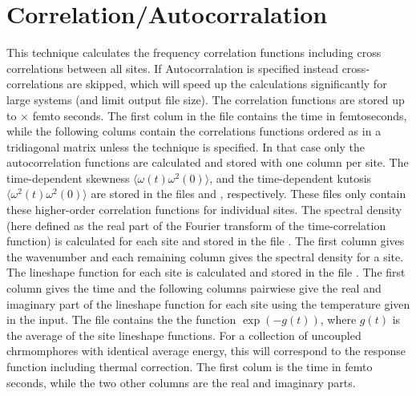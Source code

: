 \section{Correlation/Autocorralation}
This technique calculates the frequency correlation functions including cross
correlations between all sites. If Autocorralation is specified instead
cross-correlations are skipped, which will speed up the calculations significantly for
large systems (and limit output file size). The correlation functions are stored up
to $\times$ femto seconds. The first colum in the file
 contains the time in femtoseconds, while the following
colums contain the correlations functions ordered as in a tridiagonal matrix unless
the technique  is specified. In that case only the
autocorrelation functions are calculated and stored with one column per site.
The time-dependent skewness $\langle \omega(t)\omega^2(0) \rangle$, and the
time-dependent kutosis $\langle \omega^2(t)\omega^2(0) \rangle$ are stored in the files
 and , respectively. These files only contain these
higher-order correlation functions for individual sites. The spectral density (here
defined as the real part of the Fourier transform of the time-correlation function)
is calculated for each site and stored in the file . The first
column gives the wavenumber and each remaining column gives the spectral density for a
site. The lineshape function for each site is calculated and stored in the file
. The first column gives the time and the following columns
pairwiese give the real and imaginary part of the lineshape function for each site
using the temperature given in the input. The file  contains
the the function $\exp(-g(t))$, where $g(t)$ is the average of the site lineshape
functions. For a collection of uncoupled chrmomphores with identical average energy,
this will correspond to the response function including thermal correction. The first
colum is the time in femto seconds, while the two other columns are the real and
imaginary parts.

